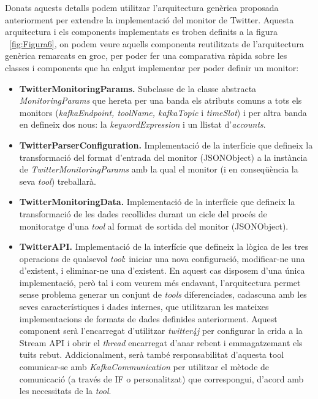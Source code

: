 Donats aquests detalls podem utilitzar l'arquitectura genèrica proposada anteriorment per extendre la implementació del monitor de Twitter. Aquesta arquitectura i els components implementats es troben definits a la figura ~\ref{fig:Figura6}, on podem veure aquells components reutilitzats de l'arquitectura genèrica remarcats en groc, per poder fer una comparativa ràpida sobre les classes i components que ha calgut implementar per poder definir un monitor:

\begin{itemize}
\item \textbf{TwitterMonitoringParams.} Subclasse de la classe abstracta \textit{MonitoringParams} que hereta per una banda els atributs comuns a tots els monitors (\textit{kafkaEndpoint, toolName, kafkaTopic} i \textit{timeSlot}) i per altra banda en defineix dos nous: la \textit{keywordExpression} i un llistat d'\textit{accounts}.
\item \textbf{TwitterParserConfiguration.} Implementació de la interfície que defineix la transformació del format d'entrada del monitor (JSONObject) a la instància de \textit{TwitterMonitoringParams} amb la qual el monitor (i en conseqüència la seva \textit{tool}) treballarà.
\item \textbf{TwitterMonitoringData.} Implementació de la interfície que defineix la transformació de les dades recollides durant un cicle del procés de monitoratge d'una \textit{tool} al format de sortida del monitor (JSONObject).
\item \textbf{TwitterAPI.} Implementació de la interfície que defineix la lògica de les tres operacions de qualsevol \textit{tool}: iniciar una nova configuració, modificar-ne una d'existent, i eliminar-ne una d'existent. En aquest cas disposem d'una única implementació, però tal i com veurem més endavant, l'arquitectura permet sense problema generar un conjunt de \textit{tools} diferenciades, cadascuna amb les seves característiques i dades internes, que utilitzaran les mateixes implementacions de formats de dades definides anteriorment. Aquest component serà l'encarregat d'utilitzar \textit{twitter4j} per configurar la crida a la Stream API i obrir el \textit{thread} encarregat d'anar rebent i emmagatzemant els tuits rebut. Addicionalment, serà també responsabilitat d'aquesta tool comunicar-se amb \textit{KafkaCommunication} per utilitzar el mètode de comunicació (a través de IF o personalitzat) que correspongui, d'acord amb les necessitats de la \textit{tool}.
\end{itemize}

